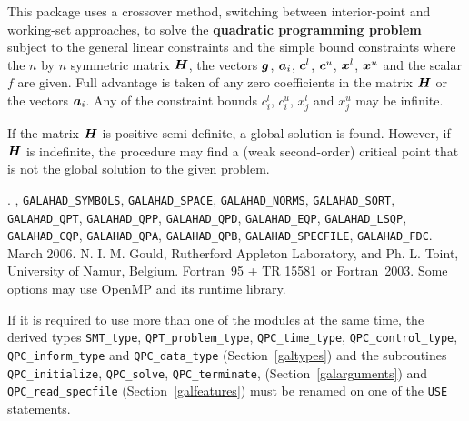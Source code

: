 \documentclass{galahad}
\newcommand{\packagename}{QPC}
\newcommand{\fullpackagename}{\libraryname\_\packagename}
\begin{document}
\galheader


\galsummary
This package uses a crossover method, switching
between interior-point and working-set approaches,
to solve the {\bf quadratic programming problem}
subject to the general linear constraints
and the simple bound constraints
where the $n$ by $n$ symmetric matrix ${\bm{H}}$, the 
vectors ${\bm{g}}$, ${\bm{a}}_{i}$, ${\bm{c}}^{l}$, ${\bm{c}}^{u}$, ${\bm{x}}^{l}$, 
${\bm{x}}^{u}$ and the scalar $f$ are given.
Full advantage is taken of any zero coefficients in the matrix ${\bm{H}}$ or the
vectors ${\bm{a}}_{i}$. 
Any of the constraint bounds $c_{i}^{l}$, $c_{i}^{u}$, 
$x_{j}^{l}$ and $x_{j}^{u}$ may be infinite.

If the matrix ${\bm{H}}$ is positive semi-definite, a global
solution is found. However, if ${\bm{H}}$ is indefinite,
the procedure may find  a (weak second-order) critical point 
that is not the global solution to the given problem.


\galattributes
\galversions{\tt  \fullpackagename\_single, \fullpackagename\_double}.
,
{\tt GALAHAD\_SY\-M\-BOLS}, 
{\tt GALAHAD\-\_\-SPACE}, 
{\tt GALAHAD\_NORMS}, 
{\tt GALAHAD\_SORT}, 
{\tt GALAHAD\_QPT},
{\tt GALAHAD\_QPP}, 
{\tt GALAHAD\_QPD}, 
{\tt GALAHAD\_EQP}, 
{\tt GALAHAD\_LSQP}, 
{\tt GALAHAD\_CQP}, 
{\tt GALAHAD\_QPA}, 
{\tt GALAHAD\_QPB}, 
{\tt GALAHAD\_SPECFILE},
{\tt GALAHAD\_FDC}.
\galdate March 2006.
\galorigin N. I. M. Gould, Rutherford Appleton Laboratory, and
Ph. L. Toint, University of Namur, Belgium.
\gallanguage Fortran~95 + TR 15581 or Fortran~2003. 
\galparallelism Some options may use OpenMP and its runtime library.


\galhowto



\noindent
If it is required to use more than one of the modules at the same time, 
the derived types
{\tt SMT\_type}, 
{\tt QPT\_problem\_type}, 
{\tt \packagename\_time\_type}, 
{\tt \packagename\_control\_type}, 
{\tt \packagename\_inform\_type} 
and
{\tt \packagename\_data\_type}
(Section~\ref{galtypes})
and the subroutines
{\tt \packagename\_initialize}, 
{\tt \packagename\_\-solve},
{\tt \packagename\_terminate},
(Section~\ref{galarguments})
and 
{\tt \packagename\_read\_specfile}
(Section~\ref{galfeatures})
must be renamed on one of the {\tt USE} statements.
\end{document}
